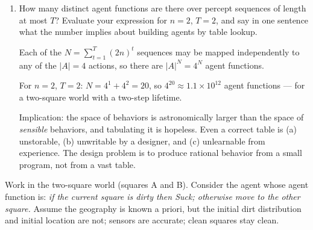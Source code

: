 \begin{enumerate}
\item How many distinct agent functions are there over percept sequences of length at most $T$?
Evaluate your expression for $n = 2$, $T = 2$, and say in one sentence what the number implies
about building agents by table lookup.
\ansspace{3.0cm}
\begin{sol}
Each of the $N = \sum_{t=1}^{T}(2n)^{t}$ sequences may be mapped independently to any of the
$|A| = 4$ actions, so there are $|A|^{N} = 4^{N}$ agent functions.

For $n = 2$, $T = 2$: $N = 4^{1} + 4^{2} = 20$, so $4^{20} \approx 1.1 \times 10^{12}$ agent
functions --- for a two-square world with a two-step lifetime.

Implication: the space of behaviors is astronomically larger than the space of \emph{sensible}
behaviors, and tabulating it is hopeless. Even a correct table is (a) unstorable, (b)
unwritable by a designer, and (c) unlearnable from experience. The design problem is to
produce rational behavior from a small program, not from a vast table.
\end{sol}
\end{enumerate}

\newpage

Work in the two-square world (squares A and B). Consider the agent whose agent function is:
\textit{if the current square is dirty then Suck; otherwise move to the other square.}
Assume the geography is known a priori, but the initial dirt distribution and initial location
are not; sensors are accurate; clean squares stay clean.

